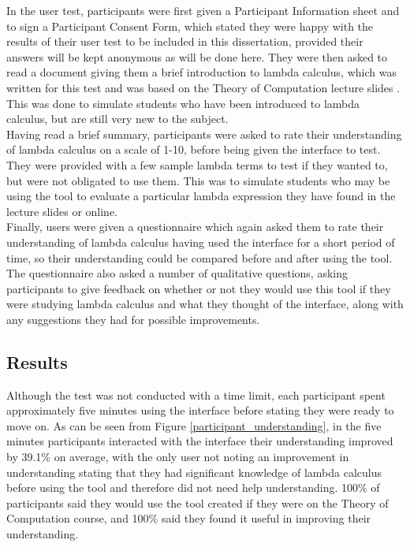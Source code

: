 \documentclass[a4paper,11pt]{report}
\begin{document}
In the user test, participants were first given a Participant Information sheet and to sign a Participant Consent Form, which stated they were happy with the results of their user test to be included in this dissertation, provided their answers will be kept anonymous as will be done here. They were then asked to read a document giving them a brief introduction to lambda calculus, which was written for this test and was based on the Theory of Computation lecture slides \cite{Gay2019}. This was done to simulate students who have been introduced to lambda calculus, but are still very new to the subject.\\

Having read a brief summary, participants were asked to rate their understanding of lambda calculus on a scale of 1-10, before being given the interface to test. They were provided with a few sample lambda terms to test if they wanted to, but were not obligated to use them. This was to simulate students who may be using the tool to evaluate a particular lambda expression they have found in the lecture slides or online.\\

Finally, users were given a questionnaire which again asked them to rate their understanding of lambda calculus having used the interface for a short period of time, so their understanding could be compared before and after using the tool. The questionnaire also asked a number of qualitative questions, asking participants to give feedback on whether or not they would use this tool if they were studying lambda calculus and what they thought of the interface, along with any suggestions they had for possible improvements.

\subsection{Results}
Although the test was not conducted with a time limit, each participant spent approximately five minutes using the interface before stating they were ready to move on. As can be seen from Figure \ref{participant_understanding}, in the five minutes participants interacted with the interface their understanding improved by 39.1\% on average, with the only user not noting an improvement in understanding stating that they had significant knowledge of lambda calculus before using the tool and therefore did not need help understanding. 100\% of participants said they would use the tool created if they were on the Theory of Computation course, and 100\% said they found it useful in improving their understanding.\\
\end{document}
